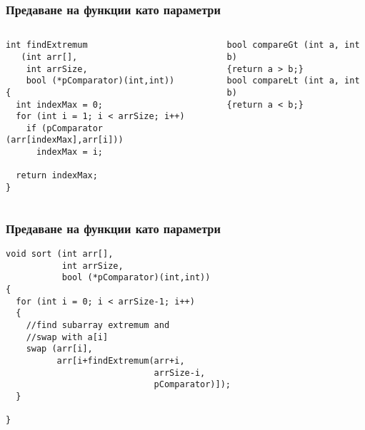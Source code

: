 \documentclass{beamer}
\begin{document}
\begin{frame}[fragile]
\frametitle{Предаване на функции като параметри}

\begin{columns}[t]
  \begin{column}{0.5\textwidth}

\begin{flushleft}
\begin{lstlisting}
int findExtremum 
   (int arr[], 
    int arrSize, 
    bool (*pComparator)(int,int))
{
  int indexMax = 0;
  for (int i = 1; i < arrSize; i++)
    if (pComparator (arr[indexMax],arr[i]))
      indexMax = i;

  return indexMax;
}
\end{lstlisting}  
\end{flushleft}

  \end{column}
  \begin{column}{0.5\textwidth}

\begin{flushleft}
\begin{lstlisting}
bool compareGt (int a, int b)
{return a > b;}
bool compareLt (int a, int b)
{return a < b;}
\end{lstlisting}  
\end{flushleft}

  \end{column}
\end{columns}

\end{frame}





\begin{frame}[fragile]
\frametitle{Предаване на функции като параметри}

\begin{flushleft}
\begin{lstlisting}
void sort (int arr[], 
           int arrSize,
           bool (*pComparator)(int,int))
{
  for (int i = 0; i < arrSize-1; i++)
  {
    //find subarray extremum and
    //swap with a[i]
    swap (arr[i],
          arr[i+findExtremum(arr+i,
                             arrSize-i,
                             pComparator)]);
  }

}
\end{lstlisting}  
\end{flushleft}


\end{frame}
\end{document}
